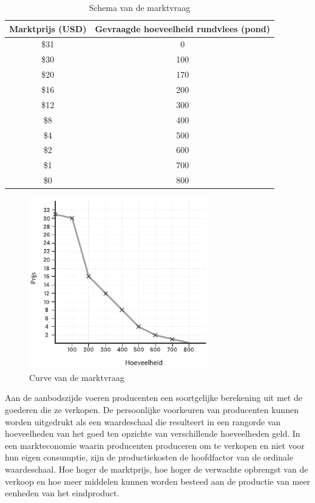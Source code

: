 \begin{table}[H]
\centering
\begin{tabular}{|c|c|}  %
\hline  %
    \cellcolor{gray!25}Marktprijs (USD) &
    \cellcolor{gray!25}Gevraagde hoeveelheid rundvlees (pond) \\
\hline  %
 \$31 & 0 \\ \hline
 \$30 & 100 \\ \hline
 \$20 & 170 \\ \hline
 \$16 & 200 \\ \hline
 \$12 & 300 \\ \hline
 \$8 & 400 \\ \hline
 \$4 & 500 \\ \hline
 \$2 & 600 \\ \hline
 \$1 & 700 \\ \hline
 \$0 & 800 \\ \hline  %
\end{tabular}
\caption{Schema van de marktvraag}
\label{tab4}
\end{table}

\begin{figure}[H]
\centering
    \includegraphics[width=0.7\textwidth]{figures/fig22.pdf}
    \caption[Curve van de marktvraag]{Curve van de marktvraag}
    \label{fig22}
\end{figure}

Aan de aanbodszijde voeren producenten een soortgelijke berekening uit met de goederen die ze verkopen. De persoonlijke voorkeuren van producenten kunnen worden uitgedrukt als een waardeschaal die resulteert in een rangorde van hoeveelheden van het goed ten opzichte van verschillende hoeveelheden geld. In een markteconomie waarin producenten produceren om te verkopen en niet voor hun eigen consumptie, zijn de productiekosten de hoofdfactor van de ordinale waardeschaal. Hoe hoger de marktprijs, hoe hoger de verwachte opbrengst van de verkoop en hoe meer middelen kunnen worden besteed aan de productie van meer eenheden van het eindproduct.

